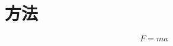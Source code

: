 \documentclass[../../../main]{subfiles}
\begin{document}
\section{方法}

\begin{equation}
    F = ma
\end{equation}
\end{document}
